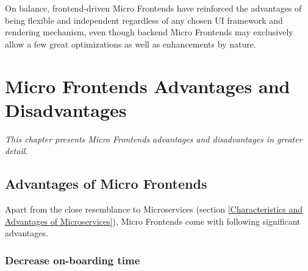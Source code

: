 \documentclass[a4paper]{book}
\begin{document}
On balance, frontend-driven Micro Frontends have reinforced the advantages of being flexible and independent regardless of any chosen UI framework and rendering mechanism, even though backend Micro Frontends may exclusively allow a few great optimizations as well as enhancements by nature.


\chapter{Micro Frontends Advantages and Disadvantages}
\textit{This chapter presents Micro Frontends advantages and disadvantages in greater detail.}
\section{Advantages of Micro Frontends}

Apart from the close resemblance to Microservices (section \ref{Characteristics and Advantages of Microservices}), Micro Frontends come with following significant advantages.

\subsection{Decrease on-boarding time}
\end{document}
